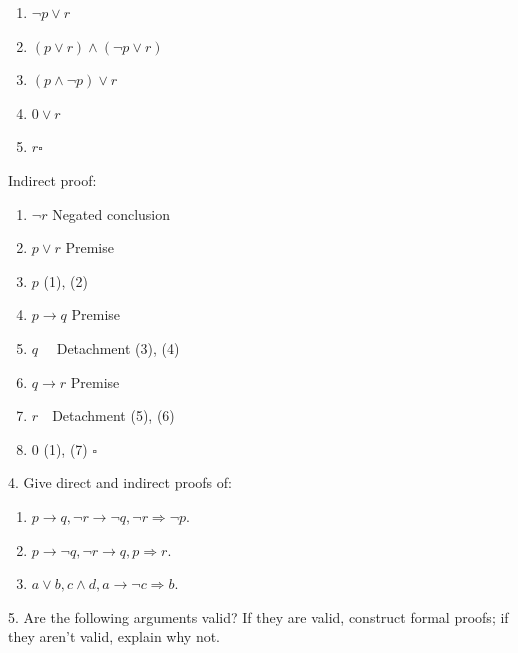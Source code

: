 \documentclass[10pt,]{book}
\theoremstyle{plain}
\theoremstyle{definition}
\theoremstyle{definition}
\theoremstyle{definition}
\theoremstyle{definition}
\begin{document}
\begin{exercisegroup}
\begin{enumerate}[label=\alph*]
\begin{enumerate}[label=\arabic*]
\item\hypertarget{li-205}{} \(\neg p\lor r\)%
\item\hypertarget{li-206}{} \((p\lor r)\land (\neg p\lor r)\)%
\item\hypertarget{li-207}{} \((p\land \neg p)\lor r\)%
\item\hypertarget{li-208}{} \(0\lor r\)%
\item\hypertarget{li-209}{} \(r\)\(\square\)%
\end{enumerate}
%
\par
Indirect proof:%
\par
%
\begin{enumerate}[label=\arabic*]
\item\hypertarget{li-210}{} \(\neg r\) Negated conclusion%
\item\hypertarget{li-211}{} \(p\lor r\) Premise%
\item\hypertarget{li-212}{}  \(p\)   (1), (2)%
\item\hypertarget{li-213}{} \(p\to q\) Premise%
\item\hypertarget{li-214}{} \(q \quad \)  Detachment (3), (4)%
\item\hypertarget{li-215}{} \(q\to r\)  Premise%
\item\hypertarget{li-216}{} \(r \quad \)Detachment (5), (6)%
\item\hypertarget{li-217}{} 0   (1), (7) \(\square\)%
\end{enumerate}
%
\end{enumerate}
%
\item[4.]\hypertarget{exercise-27}{}Give direct and indirect proofs of:%
\par
\leavevmode%
\begin{enumerate}[label=\alph*]
\item\hypertarget{li-218}{} \(p\rightarrow  q, \neg r\rightarrow  \neg q, \neg r \Rightarrow  \neg p\).%
\item\hypertarget{li-219}{} \(p\rightarrow  \neg q, \neg r\rightarrow  q, p \Rightarrow  r\).%
\item\hypertarget{li-220}{} \(a \lor  b, c \land  d, a \rightarrow  \neg c \Rightarrow  b\).%
\end{enumerate}
%
\par\smallskip
\item[5.]\hypertarget{exercise-28}{}Are the following arguments valid? If they are valid, construct formal proofs; if they aren't valid, explain why not.%
\par
\leavevmode%
\begin{enumerate}[label=\alph*]

\end{enumerate}
\end{exercisegroup}
\end{document}
